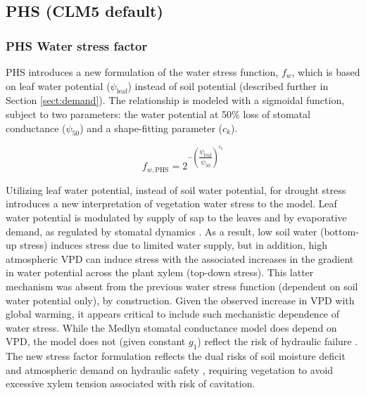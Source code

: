 \documentclass[draft,linenumbers]{agujournal}
\begin{document}
    
   
\subsection{PHS (CLM5 default)}
    \label{sect:phs}
    \subsubsection{PHS Water stress factor}
    \label{sect:fwphs}
    
    PHS introduces a new formulation of the water stress function, $f_w$, which is based on leaf water potential ($\psi_{\text{leaf}}$) instead of soil potential (described further in Section \ref{sect:demand}). The relationship is modeled with a sigmoidal function, subject to two parameters: the water potential at 50\% loss of stomatal conductance ($\psi_{50}$) and a shape-fitting parameter ($c_k$).
    
    \begin{linenomath*}
    \begin{equation}
    f_{w,\text{PHS}} = 2^{-\left(\dfrac{\psi_{\text{leaf}}}{\psi_{50}}\right)^{c_k}}
    \end{equation}
    \end{linenomath*}
    
    Utilizing leaf water potential, instead of soil water potential, for drought stress introduces a new interpretation of vegetation water stress to the model. 
    Leaf water potential is modulated by supply of sap to the leaves and by evaporative demand, as regulated by stomatal dynamics \citep{novick2016a}. 
    As a result, low soil water (bottom-up stress) induces stress due to limited water supply, but in addition, high atmospheric VPD can induce stress with the associated increases in the gradient in water potential across the plant xylem (top-down stress). 
    This latter mechanism was absent from the previous water stress function (dependent on soil water potential only), by construction.
    Given the observed increase in VPD with global warming, it appears critical to include such mechanistic dependence of water stress.
    While the Medlyn stomatal conductance model does depend on VPD, the model does not (given constant $g_1$) reflect the risk of hydraulic failure \citep{zhou2013}.
    The new stress factor formulation reflects the dual risks of soil moisture deficit and atmospheric demand on hydraulic safety \citep{williams2013}, requiring vegetation to avoid excessive xylem tension associated with risk of cavitation.
\end{document}
